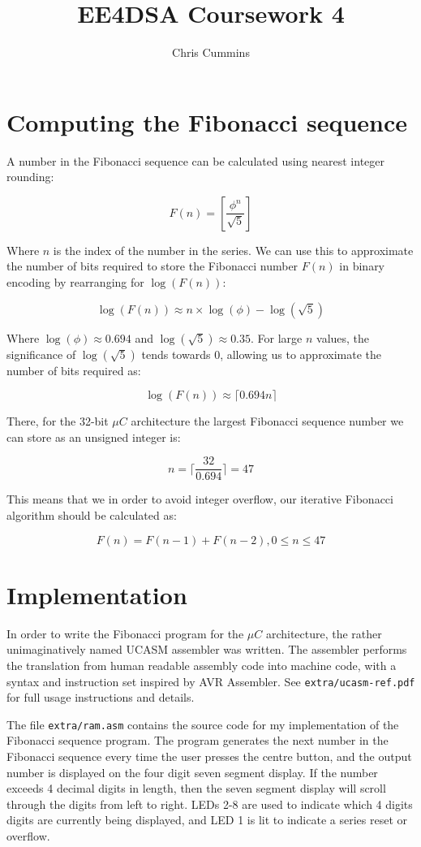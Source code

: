 \documentclass[12pt,a4paper]{article}
\title{EE4DSA Coursework 4}
\author{Chris Cummins}
\begin{document}
\maketitle

\section{Computing the Fibonacci sequence}

A number in the Fibonacci sequence can be calculated using nearest
integer rounding:

$$F(n) = \left[\frac{\phi^n}{\sqrt{5}}\right] $$

Where $n$ is the index of the number in the series. We can use this to
approximate the number of bits required to store the Fibonacci number
$F(n)$ in binary encoding by rearranging for $\log(F(n))$:

$$\log(F(n)) \approx n \times \log(\phi) - \log(\sqrt{5})$$

Where $\log(\phi) \approx 0.694$ and $\log(\sqrt{5}) \approx
0.35$. For large $n$ values, the significance of $\log(\sqrt{5})$
tends towards $0$, allowing us to approximate the number of bits
required as:

$$\log(F(n)) \approx \lceil 0.694n \rceil$$

There, for the 32-bit $\mu C$ architecture the largest Fibonacci
sequence number we can store as an unsigned integer is:

$$n = \lceil \frac{32}{0.694} \rceil = 47$$

This means that we in order to avoid integer overflow, our iterative
Fibonacci algorithm should be calculated as:

$$F(n) = F(n - 1) + F(n - 2), 0 \le n \le 47$$

\section{Implementation}

In order to write the Fibonacci program for the $\mu C$ architecture,
the rather unimaginatively named UCASM assembler was written. The
assembler performs the translation from human readable assembly code
into machine code, with a syntax and instruction set inspired by AVR
Assembler. See \texttt{extra/ucasm-ref.pdf} for full usage
instructions and details.

The file \texttt{extra/ram.asm} contains the source code for my
implementation of the Fibonacci sequence program. The program
generates the next number in the Fibonacci sequence every time the
user presses the centre button, and the output number is displayed on
the four digit seven segment display. If the number exceeds 4 decimal
digits in length, then the seven segment display will scroll through
the digits from left to right. LEDs 2-8 are used to indicate which 4
digits digits are currently being displayed, and LED 1 is lit to
indicate a series reset or overflow.
\end{document}
